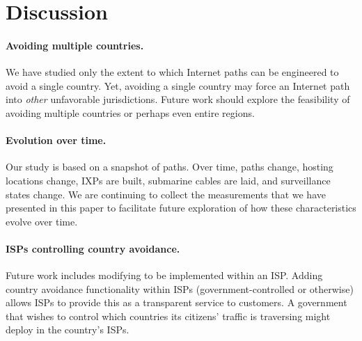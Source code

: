 \section{Discussion}
\label{sec:discussion}

\paragraph{Avoiding multiple countries.} 
We have studied only the extent to which Internet paths can be
engineered to avoid a {single} country.  Yet, avoiding a single country
may force an Internet path into {\em other} unfavorable
jurisdictions. Future work should
explore the feasibility of avoiding multiple countries or perhaps even entire regions.


\paragraph{Evolution over time.}
Our study is based on a snapshot of paths. Over time, paths
change, hosting locations change, IXPs are built, submarine cables are
laid, and surveillance states change.  We are continuing to collect
the measurements that we have presented in this paper to facilitate future exploration
of how these characteristics evolve over time.


\paragraph{ISPs controlling country avoidance.} 
Future work includes modifying \system{} to be implemented within an 
ISP.  Adding country avoidance functionality within ISPs 
(government-controlled or otherwise) allows ISPs to provide this as a transparent
service to customers.  A government that wishes to control which countries
its citizens' traffic is traversing might deploy \system{} in the country's ISPs.

